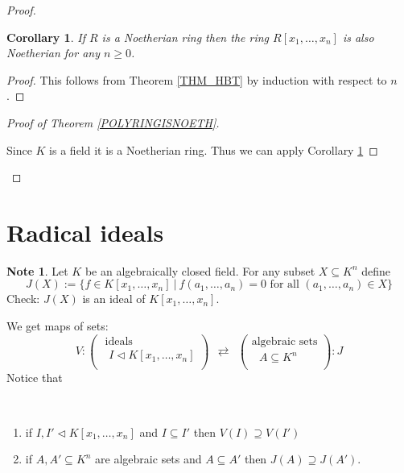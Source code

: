 \documentclass[12pt, letterpaper, oneside]{article}
\theoremstyle{plain}
\newtheorem{corollary}[theorem]{Corollary}
\theoremstyle{definition}
\newtheorem{note}[theorem]{Note}
\newcommand{\benu}{\begin{enumerate}}
\newcommand{\eenu}{\end{enumerate}}
\newcommand{\vs}{\vskip 5mm}
\begin{document}
\begin{proof}
\vs\vs

\begin{corollary}
\label{COR_HBTNVAR}
If $R$ is a Noetherian ring then  the ring $R[x_{1}, \dots, x_{n}]$ is also 
Noetherian for any $n\geq 0$. 
\end{corollary}

\vs 

\begin{proof}
This follows from Theorem \ref{THM_HBT} by induction with respect to $n$. 
\end{proof}

 \vs\vs
 
 \begin{proof}[Proof of Theorem \ref{POLYRINGISNOETH}] \ 

Since $K$ is a field it is a Noetherian ring. Thus we can apply Corollary \ref{COR_HBTNVAR}
 \end{proof}


\end{proof}





\newpage
\section{Radical ideals}
\label{SEC_RADIDEAL}




\begin{note}
Let $K$ be an algebraically closed field. For any subset $X\subseteq K^{n}$
define 
$$J(X) := \{ f\in K[x_{1}, \dots, x_{n}] \ | \ f(a_{1}, \dots, a_{n}) = 0 \text{ for all } (a_{1}, \dots, a_{n})\in X \}$$
Check: $J(X)$ is an ideal of $K[x_{1}, \dots, x_{n}]$. 

We get maps of sets:
$$
V\colon
\begin{pmatrix}
\text{ ideals} \\[1mm]
\text{  $I\lhd  K[x_{1}, \dots, x_{n}]$} \\
\end{pmatrix}
\ \ \rightleftarrows \ \ 
\begin{pmatrix}
\text{algebraic sets} \\[1mm]
\text{ $A\subseteq K^{n}$} \\
\end{pmatrix} \colon J
$$
Notice that 

\vskip -13mm

\ 
\benu
\item if $I, I' \lhd K[x_{1}, \dots, x_{n}]$  and $I \subseteq I'$ then $V(I) \supseteq V(I')$
\item if $A, A'\subseteq K^{n}$ are algebraic sets and  $A\subseteq A'$ then $J(A)\supseteq J(A')$.
\eenu

\end{note}
\end{document}
